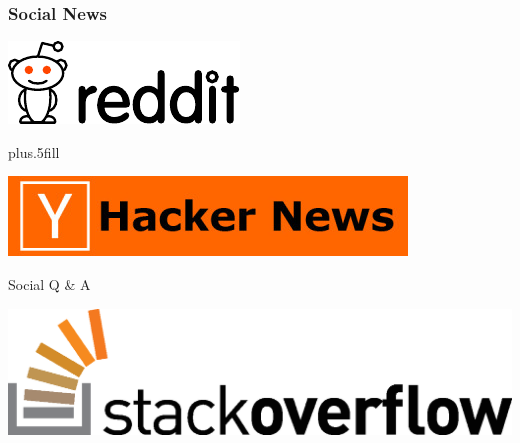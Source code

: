 \documentclass{beamer}
\newcommand{\coloreddot}[1][black]{\Large\textcolor{#1}{\ensuremath\bullet}}
\begin{document}



\begin{frame}
  \frametitle{Social News}

  \begin{center}
    \includegraphics[width=.6\textwidth]{Reddit_logo.pdf}

  \vskip0pt plus.5fill

    \includegraphics[width=.6\textwidth]{hacker-news_logo.jpg}
  \end{center}

\end{frame}


\begin{frame}{Social Q \& A}
  \begin{center}
    \includegraphics[width=.6\textwidth]{so-logo.eps}
  \end{center}
\end{frame}
\end{document}
